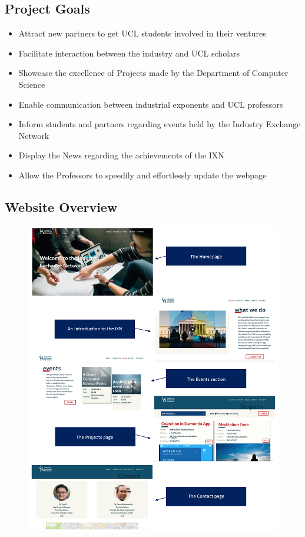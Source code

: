 \documentclass[fontsize=10pt]{extarticle}
\numberwithin{figure}{section} %
\begin{document}
\hypertarget{project-goals}{%
\subsection{Project Goals}\label{project-goals}}

\begin{itemize}
\item
  Attract new partners to get UCL students involved in their ventures
\item
  Facilitate interaction between the industry and UCL scholars
\item
  Showcase the excellence of Projects made by the Department of Computer
  Science
\item
  Enable communication between industrial exponents and UCL professors
\item
  Inform students and partners regarding events held by the Industry
  Exchange Network
\item
  Display the News regarding the achievements of the IXN
\item
  Allow the Professors to speedily and effortlessly update the webpage
\end{itemize}

\hypertarget{website-overview}{%
\subsection{Website Overview}\label{website-overview}}

\begin{figure}[H]
      \centering
      \includegraphics[trim = 0 0 0 0, clip, width=1\textwidth]{ph13.png}
 \end{figure}
\end{document}
